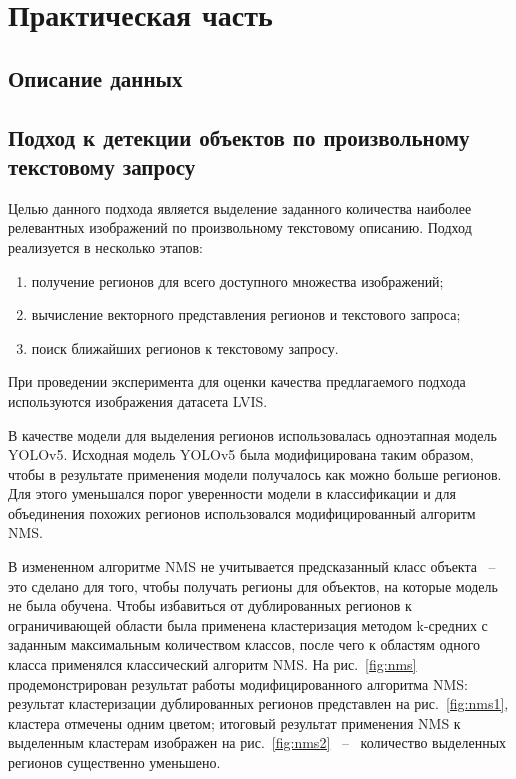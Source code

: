 \documentclass[a4paper,14pt]{article}
\begin{document}
    \newpage


    \section{Практическая часть}
    
	\subsection{Описание данных}    
    
    \subsection{Подход к детекции объектов по произвольному текстовому запросу}
    
    Целью данного подхода является выделение заданного количества наиболее релевантных изображений по произвольному текстовому описанию. 
    Подход реализуется в несколько этапов:
     \begin{enumerate}
    	[1)]
    	\itemsep0em
    	\item получение регионов для всего доступного множества изображений;
    	\item вычисление векторного представления регионов и текстового запроса;
    	\item поиск ближайших регионов к текстовому запросу.
    \end{enumerate}
    
    При проведении эксперимента для оценки качества предлагаемого подхода используются изображения датасета LVIS. 
    
    В качестве модели для выделения регионов использовалась одноэтапная модель YOLOv5. 
    Исходная модель YOLOv5 была модифицирована таким образом, чтобы в результате применения модели получалось как можно больше регионов. 
    Для этого уменьшался порог уверенности модели в классификации и для объединения похожих регионов использовался модифицированный алгоритм NMS. 
    
    В измененном алгоритме NMS не учитывается предсказанный класс объекта ~--~ это сделано для того, чтобы получать регионы  для объектов, на которые модель не была обучена. 
    Чтобы избавиться от дублированных регионов к ограничивающей области была применена кластеризация методом k-средних с заданным максимальным количеством классов, после чего к областям одного класса применялся классический алгоритм NMS. 
    На рис.~\ref{fig:nms} продемонстрирован результат работы модифицированного алгоритма NMS: результат кластеризации дублированных регионов представлен на рис.~\ref{fig:nms1}, кластера отмечены одним цветом; итоговый результат применения NMS к выделенным кластерам изображен на рис.~\ref{fig:nms2} ~--~ количество выделенных регионов существенно уменьшено.
    
\end{document}
